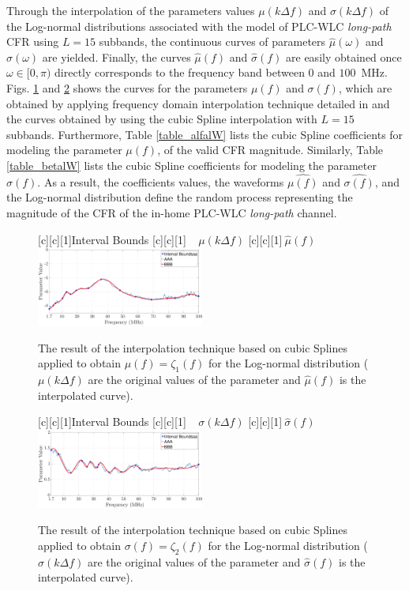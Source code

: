 \documentclass[journal]{IEEEtran}
\begin{document}
Through the interpolation of the parameters values $\mu(k\Delta f)$ and $\sigma(k\Delta f)$ of the Log-normal distributions associated with the model of \ac{PLC}-\ac{WLC} \textit{long-path} \ac{CFR} using $L=15$ subbands, the continuous curves of parameters $\hat{\mu}(\omega)$ and $\hat{\sigma}(\omega)$ are yielded. Finally, the curves $\hat{\mu}(f)$ and $\hat{\sigma}(f)$ are easily obtained once $\omega \in [0,\pi)$ directly corresponds to the frequency band between $0$ and $100$~MHz. Figs. \ref{Fit_alfalW} and \ref{Fit_betalW} shows the curves for the parameters $\mu(f)$ and $\sigma(f)$, which are obtained by applying frequency domain interpolation technique detailed in \cite{mitra} and the curves obtained by using the cubic Spline interpolation with $L=15$ subbands. Furthermore, Table \ref{table_alfalW} lists the cubic Spline coefficients for modeling the parameter $\mu(f)$, of the valid \ac{CFR} magnitude. Similarly, Table \ref{table_betalW} lists the cubic Spline coefficients for modeling the parameter $\sigma(f)$. As a result, the coefficients values, the waveforms  $\hat{\mu(f)}$ and $\hat{\sigma(f)}$, and the Log-normal distribution define the random process representing the magnitude of the \ac{CFR} of the in-home \ac{PLC}-\ac{WLC} \textit{long-path} channel.

\begin{figure}[h]
	\centering
	[c][1]{Interval Bounds}
	[c][1]{$~~~~~\mu(k \Delta f)$}
	[c][1]{$~\hat{\mu}(f)$}
	\includegraphics[width=0.49\textwidth]{images/Alfa_fitlW.eps}
	\caption{The result of the interpolation technique based on cubic Splines applied to obtain $\mu(f)=\zeta_1(f)$ for the Log-normal distribution (${\mu}(k \Delta f)$ are the original values of the parameter and $\hat{\mu}(f)$ is the interpolated curve).}
	\label{Fit_alfalW}
\end{figure}

\begin{figure}[h]
	\centering
	[c][1]{Interval Bounds}
	[c][1]{$~~~~~{\sigma}(k \Delta f)$}
	[c][1]{$~\hat{\sigma}(f)$}
	\includegraphics[width=0.49\textwidth]{images/Beta_fitlW.eps}
	\caption{The result of the interpolation technique based on cubic Splines applied to obtain $\sigma(f)=\zeta_2(f)$ for the Log-normal distribution (${\sigma}(k \Delta f)$ are the original values of the parameter and $\hat{\sigma}(f)$ is the interpolated curve).}
	\label{Fit_betalW}
\end{figure}
\end{document}
